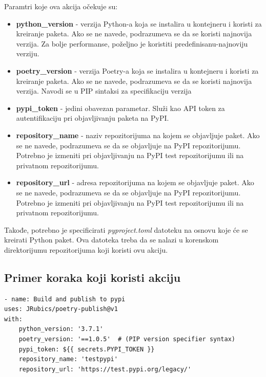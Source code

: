 \documentclass[12pt]{report}
\begin{document}
Paramtri koje ova akcija očekuje su:

\begin{itemize}
    \item \textbf{python\_version} - verzija Python-a koja se instalira u kontejneru i koristi za kreiranje paketa. Ako se ne navede, podrazumeva se da se koristi najnovija verzija. Za bolje performanse, poželjno je koristiti predefinisanu-najnoviju verziju.
    \item \textbf{poetry\_version} - verzija Poetry-a koja se instalira u kontejneru i koristi za kreiranje paketa. Ako se ne navede, podrazumeva se da se koristi najnovija verzija. Navodi se u PIP sintaksi za specifikaciju verzija
    \item \textbf{pypi\_token} - jedini obavezan parametar. Služi kao API token za autentifikaciju pri objavljivanju paketa na PyPI.
    \item \textbf{repository\_name} - naziv repozitorijuma na kojem se objavljuje paket. Ako se ne navede, podrazumeva se da se objavljuje na PyPI repozitorijumu. Potrebno je izmeniti pri objavljivanju na PyPI test repozitorijumu ili na privatnom repozitorijumu.
    \item \textbf{repository\_url} - adresa repozitorijuma na kojem se objavljuje paket. Ako se ne navede, podrazumeva se da se objavljuje na PyPI repozitorijumu. Potrebno je izmeniti pri objavljivanju na PyPI test repozitorijumu ili na privatnom repozitorijumu.
\end{itemize}

Takođe, potrebno je specificirati \textit{pyproject.toml} datoteku na osnovu koje će se kreirati Python paket. Ova datoteka treba da se nalazi u korenskom direktorijumu repozitorijuma koji koristi ovu akciju.

\subsection{Primer koraka koji koristi akciju}

\begin{verbatim}
- name: Build and publish to pypi
uses: JRubics/poetry-publish@v1
with:
    python_version: '3.7.1'
    poetry_version: '==1.0.5'  # (PIP version specifier syntax)
    pypi_token: ${{ secrets.PYPI_TOKEN }}
    repository_name: 'testpypi'
    repository_url: 'https://test.pypi.org/legacy/'
\end{verbatim}
\end{document}
